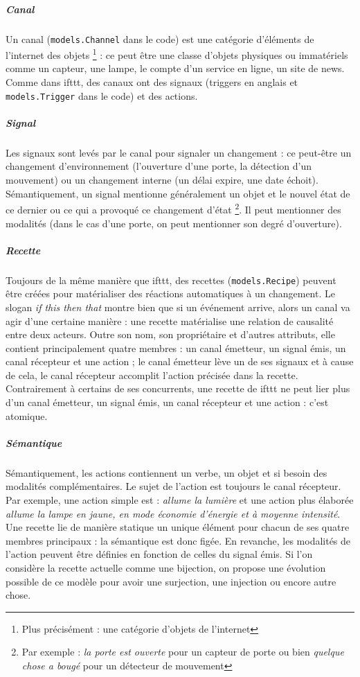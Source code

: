 \documentclass[11pt]{article}
\begin{document}
\subparagraph{Canal} Un canal (\texttt{models.Channel} dans le code) est une catégorie d'éléments de l'internet des objets \footnote{Plus précisément : une catégorie d'objets de l'internet} : ce peut être une classe d'objets physiques ou immatériels comme un capteur, une lampe, le compte d'un service en ligne, un site de news. Comme dans ifttt, des canaux ont des signaux (triggers en anglais et \texttt{models.Trigger} dans le code) et des actions.

\subparagraph{Signal} Les signaux sont levés par le canal pour signaler un changement : ce peut-être un changement d'environnement (l'ouverture d'une porte, la détection d'un mouvement) ou un changement interne (un délai expire, une date échoit). Sémantiquement, un signal mentionne généralement un objet et le nouvel état de ce dernier ou ce qui a provoqué ce changement d'état \footnote{Par exemple : \textsl{la porte est ouverte} pour un capteur de porte ou bien \textsl{quelque chose a bougé} pour un détecteur de mouvement}. Il peut mentionner des modalités (dans le cas d'une porte, on peut mentionner son degré d'ouverture).

\subparagraph{Recette} Toujours de la même manière que ifttt, des recettes (\texttt{models.Recipe}) peuvent être créées pour matérialiser des réactions automatiques à un changement. Le slogan \textsl{if this then that} montre bien que si un événement arrive, alors un canal va agir d'une certaine manière : une recette matérialise une relation de causalité entre deux acteurs. Outre son nom, son propriétaire et d'autres attributs, elle contient principalement quatre membres : un canal émetteur, un signal émis, un canal récepteur et une action ; le canal émetteur lève un de ses signaux et à cause de cela, le canal récepteur accomplit l'action précisée dans la recette. Contrairement à certains de ses concurrents, une recette de ifttt ne peut lier plus d'un canal émetteur, un signal émis, un canal récepteur et une action : c'est atomique.

\subparagraph{Sémantique} Sémantiquement, les actions contiennent un verbe, un objet et si besoin des modalités complémentaires. Le sujet de l'action est toujours le canal récepteur. Par exemple, une action simple est : \textsl{allume la lumière} et une action plus élaborée \textsl{allume la lampe en jaune, en mode économie d'énergie et à moyenne intensité}. Une recette lie de manière statique un unique élément pour chacun de ses quatre membres principaux : la sémantique est donc figée. En revanche, les modalités de l'action peuvent être définies en fonction de celles du signal émis. Si l'on considère la recette actuelle comme une bijection, on propose une évolution possible de ce modèle pour avoir une surjection, une injection ou encore autre chose.
\end{document}
